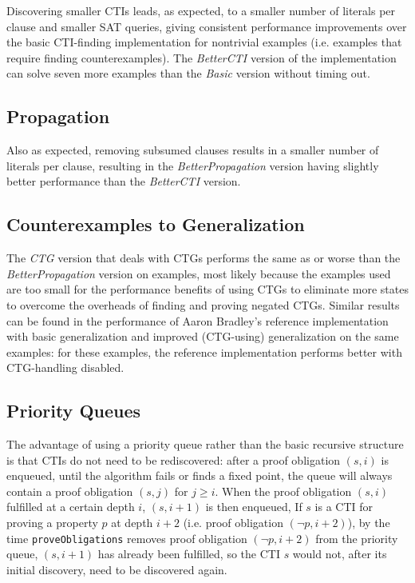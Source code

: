 \documentclass[12pt,a4paper,twoside,openright]{report}
\begin{document}
Discovering smaller CTIs leads, as expected, to a smaller number of literals per clause and smaller SAT queries,
giving consistent performance improvements over the basic CTI-finding implementation for nontrivial
examples (i.e. examples that require finding counterexamples). The \emph{BetterCTI} version of the implementation
can solve seven more examples than the \emph{Basic} version without timing out.

\subsection{Propagation}

Also as expected, removing subsumed clauses results in a smaller number of literals per clause, resulting in
the \emph{BetterPropagation} version having slightly better performance than the \emph{BetterCTI} version.

\subsection{Counterexamples to Generalization}

The \emph{CTG} version that deals with CTGs performs the same as or worse than the \emph{BetterPropagation} version
on examples, most likely because the examples used are too small for the performance benefits of using CTGs to
eliminate more states to overcome the overheads of finding and proving negated CTGs. Similar results can be found
in the performance of Aaron Bradley's reference implementation with basic generalization and
improved (CTG-using) generalization on the same examples: for these examples, the reference implementation performs
better with CTG-handling disabled.

\subsection{Priority Queues}

The advantage of using a priority queue rather than the basic recursive structure is that CTIs do not need
to be rediscovered: after a proof obligation $(s,i)$ is enqueued, until the algorithm fails or finds a fixed point,
the queue will always contain a proof obligation $(s,j)$ for $j \geq i$. When the proof obligation $(s,i)$
fulfilled at a certain depth $i$, $(s,i + 1)$ is then enqueued, If $s$ is a CTI for proving a property
$p$ at depth $i + 2$ (i.e. proof obligation $(\neg p, i + 2)$), by the time \verb,proveObligations, removes
proof obligation $(\neg p, i + 2)$ from the priority queue, $(s, i+1)$ has already been fulfilled, so the
CTI $s$ would not, after its initial discovery, need to be discovered again.
\end{document}
